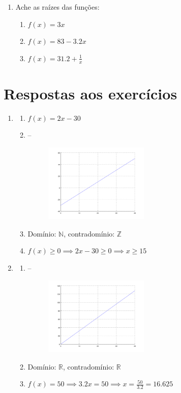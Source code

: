 \documentclass[11pt]{article}
\begin{document}
\begin{enumerate}
	\item Ache as raízes das funções:
	\begin{enumerate}
		\item $f(x) = 3x$
		\item $f(x) = 83 - 3.2x$
		\item $f(x) = 31.2 + \frac{1}{x}$
	\end{enumerate}
\end{enumerate}

\newpage

\section{Respostas aos exercícios}
\begin{enumerate}
	\item 
	\begin{enumerate}
		\item $f(x) = 2x - 30$
		\item --
		\begin{figure}[H]
				\centering
				\includegraphics[width=0.5\textwidth]{imgs/ex1.png}
		\end{figure}
		\item Domínio: $\mathbb{N}$, contradomínio: $\mathbb{Z}$
		\item $f(x) \geq 0\implies 2x - 30 \geq 0 \implies x \geq 15$
	\end{enumerate}

	\item 
	\begin{enumerate}
		\item --
		\begin{figure}[H]
				\centering
				\includegraphics[width=0.5\textwidth]{imgs/ex2.png}
		\end{figure}
		\item Domínio: $\mathbb{R}$, contradomínio: $\mathbb{R}$
		\item $f(x) = 50 \implies 3.2x = 50 \implies x = \frac{50}{3.2} 
		      = 16.625$
	\end{enumerate}


\end{enumerate}
\end{document}
